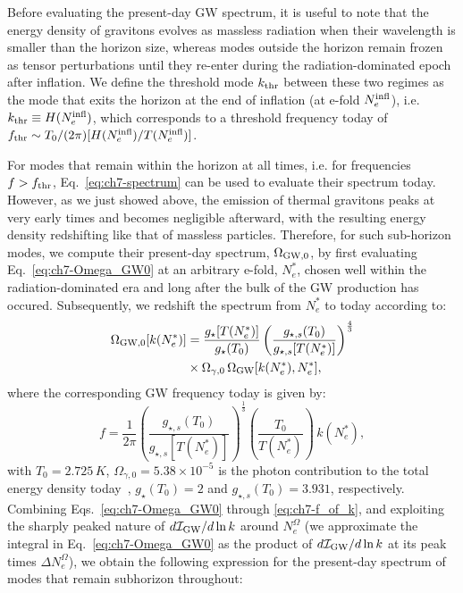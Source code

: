 Before evaluating the present-day GW spectrum, it is useful to note that the energy density of gravitons evolves as massless radiation when their wavelength is smaller than the horizon size, whereas modes outside the horizon remain frozen as tensor perturbations until they re-enter during the radiation-dominated epoch after inflation. We define the threshold mode $k_{\rm thr}$ between these two regimes as the mode that exits the horizon at the end of inflation (at e-fold $N_e^{\rm infl}$), i.e. $k_{\rm thr}\equiv H(N_e^{\rm infl})$, which corresponds to a threshold frequency today of $f_{\rm thr}\sim T_0/(2\pi)[H(N_e^{\rm infl})/T(N^{\rm infl}_{e})]$.

For modes that remain within the horizon at all times, i.e. for frequencies $f>f_{\rm thr}$, Eq.~\eqref{eq:ch7-spectrum} can be used to evaluate their spectrum today. However, as we just showed above, the emission of thermal gravitons peaks at very early times and becomes negligible afterward, with the resulting energy density redshifting like that of massless particles. Therefore, for such sub-horizon modes, we compute their present-day spectrum, $\Omega_{\rm GW,0}$, by first evaluating Eq.~\eqref{eq:ch7-Omega_GW0} at an arbitrary e-fold, $N^*_{e}$, chosen well within the radiation-dominated era and long after the bulk of the GW production has occured. Subsequently, we redshift the spectrum from $N^*_{e}$ to today according to:
\begin{align}
\nonumber \Omega_{\rm GW,0}[k(N^*_{e})]&=\frac{g_{\star}[T(N^*_{e})]}{g_\star(T_0)}\left(\frac{g_{\star,s}(T_0)}{g_{\star,s}[T(N^*_{e})]}\right)^{\frac{4}{3}}\\
    &\times\Omega_{\gamma,0} \,\Omega_{\rm GW}[k(N^*_{e}), N^*_{e}], \label{eq:ch7-Omega_GW0_v2}
\end{align}
where the corresponding GW frequency today is given by:
\begin{equation}
    f=\frac{1}{2\pi}\left(\frac{g_{\star,s}(T_0)}{g_{\star,s}[T(N^*_{e})]}\right)^{\frac{1}{3}}\left(\frac{T_0}{T(N^*_{e})}\right)\,k(N^*_{e}), \label{eq:ch7-f_of_k}
\end{equation}
with  $T_0=2.725\,K$, $\Omega_{\gamma,0}=5.38\times 10^{-5}$ is the photon contribution to the total energy density today~\cite{Planck:2018vyg}, $g_\star(T_0)=2$ and $g_{\star, s}(T_0)=3.931$, respectively.
Combining Eqs.~\eqref{eq:ch7-Omega_GW0} through \eqref{eq:ch7-f_of_k}, and exploiting the sharply peaked nature of $d\mathcal{I}_{\rm GW}/d\ln k$ around $N_e^{\Omega}$ (we approximate the integral in Eq.~\eqref{eq:ch7-Omega_GW0} as the product of $d\mathcal{I}_{\rm GW}/d\ln k$ at its peak times $\Delta N_e^\Omega$), we obtain the following expression for the present-day spectrum of modes that remain subhorizon throughout:
